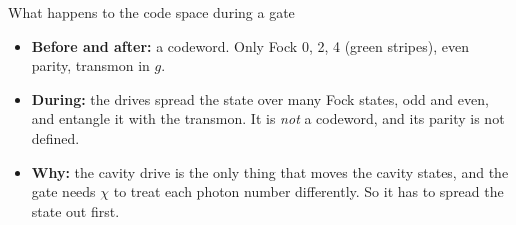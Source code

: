 \begin{frame}{What happens to the code space during a gate}
  \centering

  \medskip
  \begin{itemize}\small
    \item \textbf{Before and after:} a codeword. Only Fock 0, 2, 4 (green stripes), even parity,
          transmon in $g$.
    \item \textbf{During:} the drives spread the state over many Fock states, odd and even, and
          entangle it with the transmon. It is \emph{not} a codeword, and its parity is not
          defined.
    \item \textbf{Why:} the cavity drive is the only thing that moves the cavity states, and
          the gate needs $\chi$ to treat each photon number differently. So it has to spread
          the state out first.
  \end{itemize}


\end{frame}
